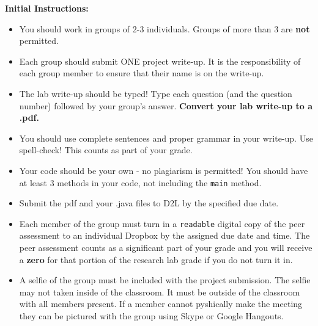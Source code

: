 \documentclass[12pt]{article}
\begin{document}
\vspace*{0.5cm}
\noindent\textbf{Initial Instructions:}
\begin{itemize}
	\item You should work in groups of 2-3 individuals. Groups of more than 3 are \textbf{not} permitted.
	\item Each group should submit ONE project write-up. It is the responsibility of each group member to ensure that their name is on the write-up.
	\item The lab write-up should be typed! Type each question (and the question number) followed by your group's answer. \textbf{Convert your lab write-up to a .pdf.}
	\item You should use complete sentences and proper grammar in your write-up. Use spell-check! This counts as part of your grade.
	\item Your code should be your own - no plagiarism is permitted! You should have at least 3 methods in your code, not including the \texttt{main} method.
	\item Submit the pdf and your .java files to D2L by the specified due date.
	\item Each member of the group must turn in a \texttt{readable} digital copy of the peer assessment to an individual Dropbox by the assigned due date and time. The peer assessment counts as a significant part of your grade and you will receive a \textbf{zero} for that portion of the research lab grade if you do not turn it in. 
	\item A selfie of the group must be included with the project submission. The selfie may not taken inside of the classroom. It must be outside of the classroom with all members present. If a member cannot pyshically make the meeting they can be pictured with the group using  Skype or Google Hangouts.
\end{itemize}
\end{document}
